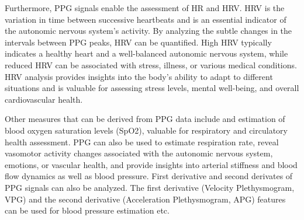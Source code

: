 Furthermore, PPG signals enable the assessment of HR and \gls{HRV}. HRV is the variation in time between successive heartbeats and is an essential indicator of the autonomic nervous system's activity. By analyzing the subtle changes in the intervals between PPG peaks, HRV can be quantified. High HRV typically indicates a healthy heart and a well-balanced autonomic nervous system, while reduced HRV can be associated with stress, illness, or various medical conditions. HRV analysis provides insights into the body's ability to adapt to different situations and is valuable for assessing stress levels, mental well-being, and overall cardiovascular health.

Other measures that can be derived from PPG data include  and estimation of blood oxygen saturation levels (SpO2), valuable for respiratory and circulatory health assessment. PPG can also be used to estimate respiration rate, reveal vasomotor activity changes associated with the autonomic nervous system, emotions, or vascular health, and provide insights into arterial stiffness and blood flow dynamics as well as blood pressure. First derivative and second derivates of PPG signals can also be analyzed. The first derivative (Velocity Plethysmogram, VPG) and the second derivative (Acceleration Plethysmogram, APG) features can be used for  blood pressure estimation etc.\parencite{apg}


